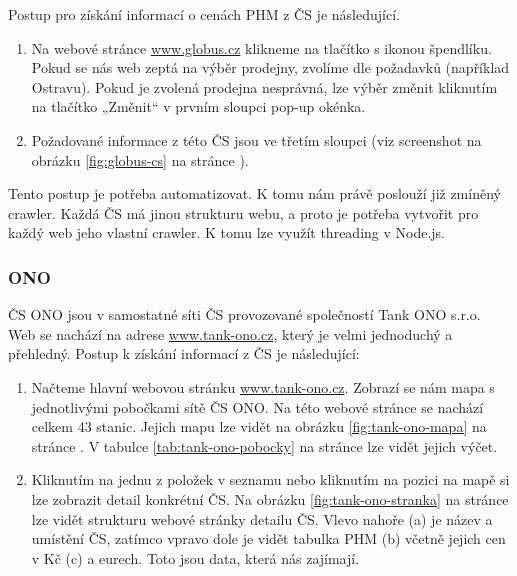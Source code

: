 Postup pro získání informací o cenách PHM z ČS je následující.

\begin{enumerate}
    \item Na webové stránce \url{www.globus.cz} klikneme na tlačítko s ikonou
        špendlíku. Pokud se nás web zeptá na výběr prodejny, zvolíme
        dle požadavků (například Ostravu). Pokud je zvolená prodejna
        nesprávná, lze výběr změnit kliknutím na tlačítko „Změnit“
        v prvním sloupci pop-up okénka.
    \item Požadované informace z této ČS jsou ve třetím sloupci (viz
        screenshot na obrázku \ref{fig:globus-cs} na stránce
        \pageref{fig:globus-cs}).
\end{enumerate}

Tento postup je potřeba automatizovat. K tomu nám právě poslouží již
zmíněný crawler. Každá ČS má jinou strukturu webu, a proto je potřeba
vytvořit pro každý web jeho vlastní crawler. K tomu lze využít threading
v Node.js.

\subsubsection{ONO}

ČS ONO jsou v samostatné síti ČS provozované společností Tank ONO s.r.o.
Web se nachází na adrese \url{www.tank-ono.cz}, který je velmi jednoduchý
a přehledný. Postup k získání informací z ČS je následující:

\begin{enumerate}
    \item Načteme hlavní webovou stránku \url{www.tank-ono.cz}. Zobrazí
        se nám mapa s jednotlivými pobočkami sítě ČS ONO. Na této webové
        stránce se nachází celkem 43 stanic. Jejich mapu lze vidět
        na obrázku \ref{fig:tank-ono-mapa} na stránce
        \pageref{fig:tank-ono-mapa}. V tabulce \ref{tab:tank-ono-pobocky}
        na stránce \pageref{tab:tank-ono-pobocky} lze vidět jejich výčet.
    \item Kliknutím na jednu z položek v seznamu nebo kliknutím na pozici
        na mapě si lze zobrazit detail konkrétní ČS. Na obrázku
        \ref{fig:tank-ono-stranka} na stránce \pageref{fig:tank-ono-stranka}
        lze vidět strukturu webové stránky detailu ČS. Vlevo nahoře (a) je název
        a umístění ČS, zatímco vpravo dole je vidět tabulka PHM (b) včetně jejich
        cen v Kč (c) a eurech. Toto jsou data, která nás zajímají.
\end{enumerate}

